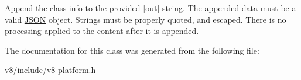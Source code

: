 Append the class info to the provided $\vert$out$\vert$ string. The appended data must be a valid \mbox{\hyperlink{classv8_1_1JSON}{J\+S\+ON}} object. Strings must be properly quoted, and escaped. There is no processing applied to the content after it is appended. 

The documentation for this class was generated from the following file\+:\begin{DoxyCompactItemize}
\item 
v8/include/v8-\/platform.\+h\end{DoxyCompactItemize}
